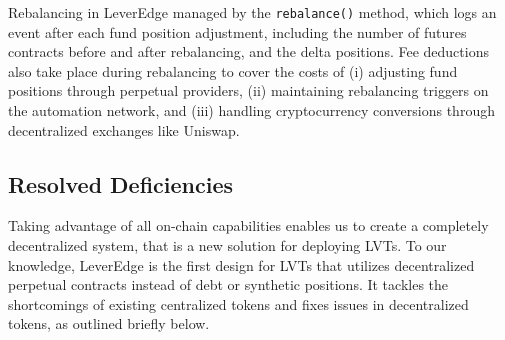 Rebalancing in LeverEdge managed by the \texttt{rebalance()} method, which logs an event after each fund position adjustment, including the number of futures contracts before and after rebalancing, and the delta positions. Fee deductions also take place during rebalancing to cover the costs of (i) adjusting fund positions through perpetual providers, (ii) maintaining rebalancing triggers on the automation network, and (iii) handling cryptocurrency conversions through decentralized exchanges like Uniswap.



\subsection{Resolved Deficiencies}\label{subsec:resolved}
Taking advantage of all on-chain capabilities enables us to create a completely decentralized system, that is a new solution for deploying LVTs. To our knowledge, LeverEdge is the first design for LVTs that utilizes decentralized perpetual contracts instead of debt or synthetic positions. It tackles the shortcomings of existing centralized tokens and fixes issues in decentralized tokens, as outlined briefly below.
